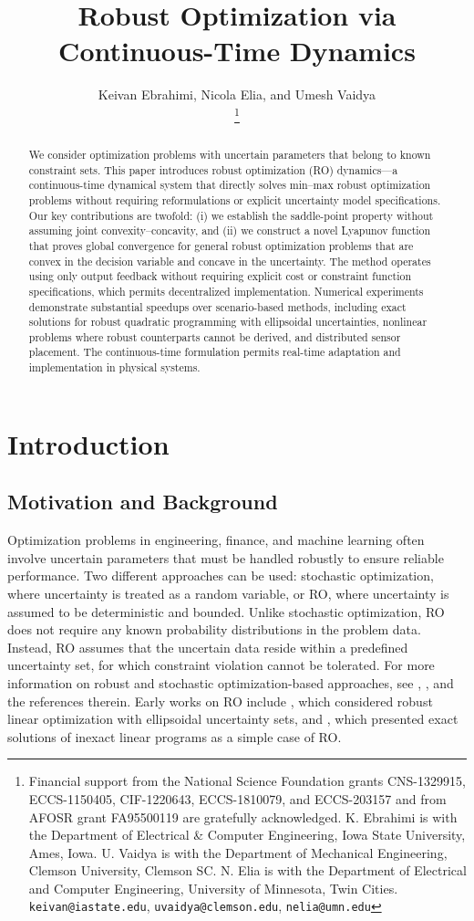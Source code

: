 \documentclass[journal,twoside,web]{ieeecolor}
\title{\LARGE \bf Robust Optimization via Continuous-Time Dynamics}
\author{Keivan Ebrahimi, Nicola Elia, and Umesh Vaidya\\
\thanks{Financial support from the National Science Foundation grants CNS-1329915, ECCS-1150405, CIF-1220643, ECCS-1810079, and ECCS-203157 and from AFOSR grant FA95500119 are gratefully acknowledged. K. Ebrahimi is with the Department of Electrical \& Computer Engineering, Iowa State University, Ames, Iowa. U. Vaidya is with the Department of Mechanical Engineering, Clemson University, Clemson SC.  N. Elia is with the Department of Electrical and Computer Engineering, University of Minnesota, Twin Cities.
{\tt\small keivan@iastate.edu},
{\tt\small uvaidya@clemson.edu},
{\tt\small nelia@umn.edu}
}}
\newcommand{\rev}[1]{\textcolor{revisionblue}{#1}}
\begin{document}
\pagestyle{headings}
\setcounter{page}{1}

\maketitle

\begin{abstract}
We consider optimization problems with uncertain parameters that belong to known constraint sets. This paper introduces robust optimization (RO) dynamics—a continuous-time dynamical system that directly solves min–max robust optimization problems without requiring reformulations or explicit uncertainty model specifications. Our key contributions are twofold: (i) we establish the saddle-point property without assuming joint convexity–concavity, and (ii) we construct a novel Lyapunov function that proves global convergence for general robust optimization problems that are convex in the decision variable and concave in the uncertainty. The method operates using only output feedback without requiring explicit cost or constraint function specifications, which permits decentralized implementation. Numerical experiments demonstrate substantial speedups over scenario-based methods, including exact solutions for robust quadratic programming with ellipsoidal uncertainties, nonlinear problems where robust counterparts cannot be derived, and distributed sensor placement. The continuous-time formulation permits real-time adaptation and implementation in physical systems.
\end{abstract}

\section{Introduction}

\subsection*{\rev{Motivation and Background}}

{\color{revisionblue}Optimization problems in engineering, finance, and machine learning often involve uncertain parameters that must be handled robustly to ensure reliable performance. Two different approaches can be used: stochastic optimization, where uncertainty is treated as a random variable, or RO, where uncertainty is assumed to be deterministic and bounded. Unlike stochastic optimization, RO does not require any known probability distributions in the problem data. Instead, RO assumes that the uncertain data reside within a predefined uncertainty set, for which constraint violation cannot be tolerated. For more information on robust and stochastic optimization-based approaches, see \cite{bental2009}, \cite{bertsimas2011}, and the references therein. Early works on RO include \cite{soyster1976}, which considered robust linear optimization with ellipsoidal uncertainty sets, and \cite{falk1976}, which presented exact solutions of inexact linear programs as a simple case of RO.}
\end{document}
